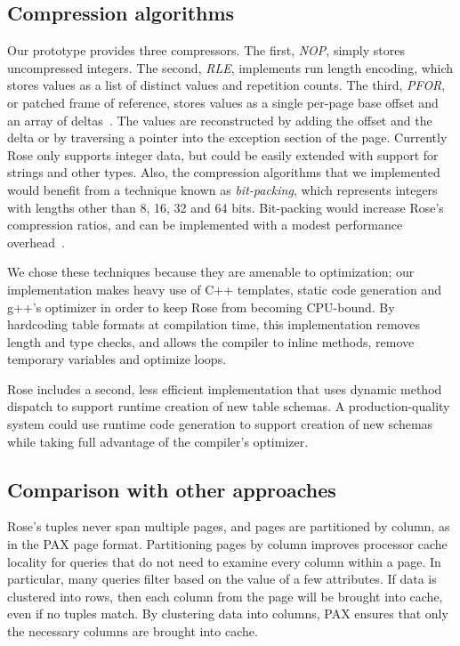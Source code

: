 \documentclass{vldb}
\newcommand{\rows}{Rose\xspace}
\newcommand{\rowss}{Rose's\xspace}
\begin{document}
\subsection{Compression algorithms}
Our prototype provides three compressors.  The first, {\em NOP},
simply stores uncompressed integers.  The second, {\em RLE},
implements run length encoding, which stores values as a list of
distinct values and repetition counts.  The third, {\em PFOR}, or
patched frame of reference, stores values as a single per-page
base offset and an array of deltas~\cite{pfor}.  The values are reconstructed by
adding the offset and the delta or by traversing a pointer into the
exception section of the page.  Currently \rows only supports integer
data, but could be easily extended with support for strings and
other types.  Also, the compression algorithms that we
implemented would benefit from a technique known as {\em bit-packing},
which represents integers with lengths other than 8, 16, 32 and 64
bits.  Bit-packing would increase \rowss compression ratios,
and can be implemented with a modest performance overhead~\cite{pfor}.

We chose these techniques because they are amenable to optimization;
our implementation makes heavy use of C++ templates, static code
generation and g++'s optimizer in order to keep \rows from becoming
CPU-bound.  By hardcoding table formats at compilation time, this
implementation removes length and type checks, and allows the compiler
to inline methods, remove temporary variables and optimize loops.

\rows includes a second, less efficient implementation that uses
dynamic method dispatch to support runtime creation of new table
schemas.  A production-quality system could use runtime code
generation to support creation of new schemas while taking full
advantage of the compiler's optimizer.

\subsection{Comparison with other approaches}

\rowss tuples never span multiple pages, and pages are partitioned by
column, as in the PAX page format.  Partitioning pages by column
improves processor cache locality for queries that do not need to
examine every column within a page.  In particular, many queries
filter based on the value of a few attributes.  If data is clustered
into rows, then each column from the page will be brought into cache,
even if no tuples match.  By clustering data into columns, PAX ensures
that only the necessary columns are brought into cache\cite{PAX}.
\end{document}
